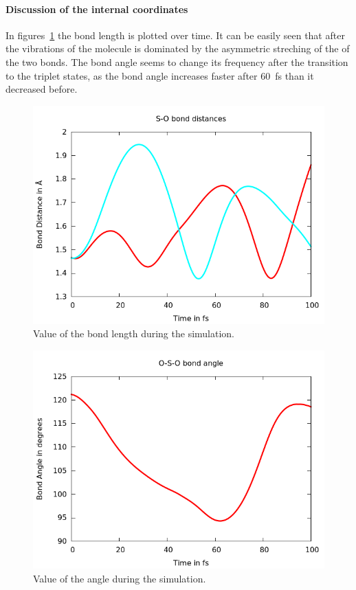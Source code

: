 \documentclass[a4paper,11pt,DIV=15,openany]{scrbook}
\begin{document}
\paragraph{Discussion of the internal coordinates} 

In figures~\ref{fig:so} the  bond length is plotted over time. It can be easily seen that after the vibrations of the molecule is dominated by the asymmetric streching of the of the two  bonds. The  bond angle seems to change its frequency after the transition to the triplet states, as the bond angle increases faster after 60~fs than it decreased before.

\begin{figure}[htb]
  \centering
  \includegraphics[width=\textwidth]{figures/SO.png}
  \caption{Value of the  bond length during the simulation.}
  \label{fig:so}
\end{figure}

\begin{figure}[htb]
  \centering
  \includegraphics[width=\textwidth]{figures/SO_angle.png}
  \caption{Value of the  angle during the simulation.}
  \label{fig:so_angle}
\end{figure}
\end{document}
